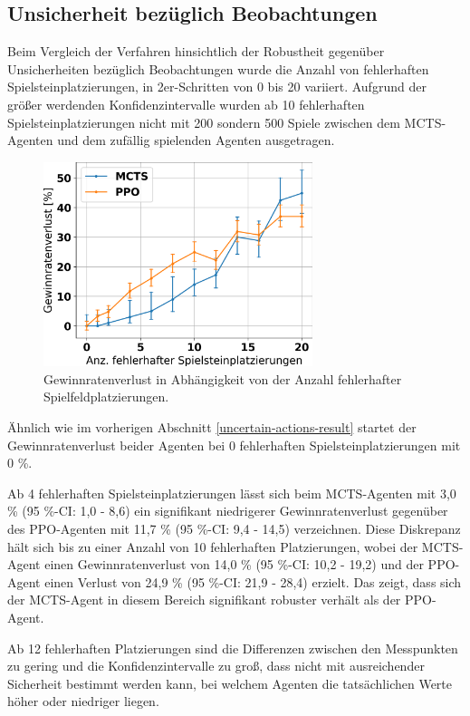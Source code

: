 \subsection{Unsicherheit bezüglich Beobachtungen}

Beim Vergleich der Verfahren hinsichtlich der Robustheit gegenüber Unsicherheiten bezüglich Beobachtungen wurde die Anzahl von fehlerhaften Spielsteinplatzierungen, in 2er-Schritten von 0 bis 20 variiert. Aufgrund der größer werdenden Konfidenzintervalle wurden ab 10 fehlerhaften Spielsteinplatzierungen nicht mit 200 sondern 500 Spiele zwischen dem MCTS-Agenten und dem zufällig spielenden Agenten ausgetragen.

\begin{figure}[ht!]%
	\includegraphics[width=0.7\textwidth, center]{Bilder/robustness-results/uncertain_observations_win_rate_losses.png}
	\caption{Gewinnratenverlust in Abhängigkeit von der Anzahl fehlerhafter Spielfeldplatzierungen.}
\end{figure}

Ähnlich wie im vorherigen Abschnitt \ref{uncertain-actions-result} startet der Gewinnratenverlust beider Agenten bei 0 fehlerhaften Spielsteinplatzierungen mit 0 \%.

Ab 4 fehlerhaften Spielsteinplatzierungen lässt sich beim MCTS-Agenten mit 3,0 \% (95 \%-CI: 1,0 - 8,6) ein signifikant niedrigerer Gewinnratenverlust gegenüber des PPO-Agenten mit 11,7 \% (95 \%-CI: 9,4 - 14,5) verzeichnen. Diese Diskrepanz hält sich bis zu einer Anzahl von 10 fehlerhaften Platzierungen, wobei der MCTS-Agent einen Gewinnratenverlust von 14,0 \% (95 \%-CI: 10,2 - 19,2) und der PPO-Agent einen Verlust von 24,9 \% (95 \%-CI: 21,9 - 28,4) erzielt. Das zeigt, dass sich der MCTS-Agent in diesem Bereich signifikant robuster verhält als der PPO-Agent.

Ab 12 fehlerhaften Platzierungen sind die Differenzen zwischen den Messpunkten zu gering und die Konfidenzintervalle zu groß, dass nicht mit ausreichender Sicherheit bestimmt werden kann, bei welchem Agenten die tatsächlichen Werte höher oder niedriger liegen.

